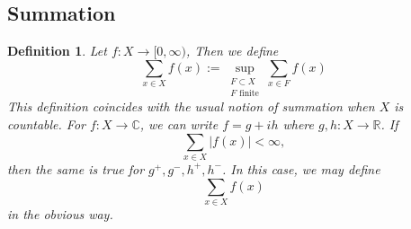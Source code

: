 \documentclass[12pt]{amsart}
\newtheorem{defn}[thm]{Definition}
\newcommand{\C}{\mathbb{C}}
\newcommand{\R}{\mathbb{R}}
\newcommand{\Rg}{[0,\infty)}
\begin{document}
\subsection{Summation}

\begin{defn}
Let $f:X \rightarrow \Rg$, Then we define $$\sum_{x \in X} f(x) := \sup_{\substack{F \subset X \\ F \text{ finite}}} \sum_{x \in F} f(x)$$ This definition coincides with the usual notion of summation when $X$ is countable. For $f:X \rightarrow \C$, we can write $f = g +ih$ where $g,h:X \rightarrow \R$. If $$\sum_{x \in X}|f(x)| < \infty,$$ then the same is true for $g^+,g^-,h^+,h^-$. In this case, we may define $$\sum_{x \in X} f(x)$$ in the obvious way.
\end{defn}
\end{document}
